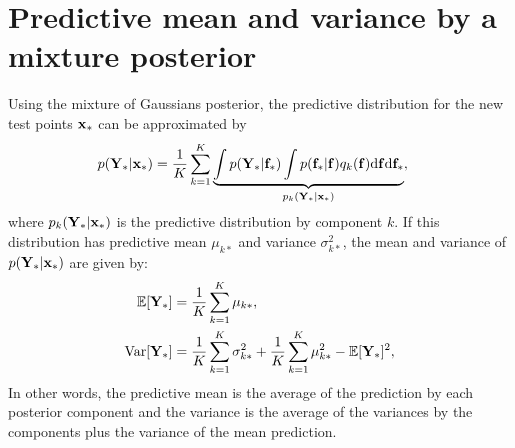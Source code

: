 \documentclass{article} %
\begin{document}
\section{Predictive mean and variance by a mixture posterior}
Using the mixture of Gaussians posterior, the predictive distribution for the new test points $\mathbf{x}_*$ can be approximated by
\begin{align}
p(\mathbf{Y}_{*} | \mathbf{x}_*) 
&= \frac{1}{K} \sum_{k=1}^K \underbrace{\int p(\mathbf{Y}_{*} | \mathbf{f}_*) \int p(\mathbf{f}_* | \mathbf{f}) q_k(\mathbf{f}) \mathrm{d} \mathbf{f} \mathrm{d} \mathbf{f}_*}_{p_k(\mathbf{Y}_{*} | \mathbf{x}_*)},
\end{align}
where $p_k(\mathbf{Y}_{*} | \mathbf{x}_*)$ is the predictive distribution by component $k$. 
If this distribution has predictive mean $\mu_{k*}$ and variance $\sigma^2_{k*}$, the mean and variance of $p(\mathbf{Y}_{*} | \mathbf{x}_*)$ are given by:
\begin{align}
\mathbb{E} [\mathbf{Y}_{*}] &= \frac{1}{K} \sum_{k=1}^K \mu_{k*}, \\
\text{Var} [\mathbf{Y}_{*}] &= \frac{1}{K} \sum_{k=1}^K \sigma_{k*}^2 + \frac{1}{K} \sum_{k=1}^K \mu_{k*}^2 - \mathbb{E} [\mathbf{Y}_{*}]^2,
\end{align}
In other words, the predictive mean is the average of the prediction by each posterior component and the variance is the average of the variances by the components plus the variance of the mean prediction.



\end{document}
